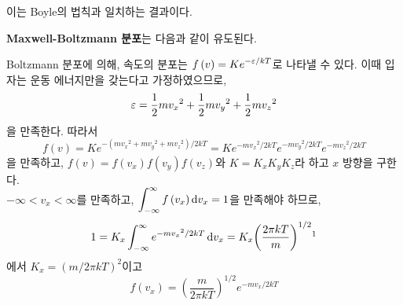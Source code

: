            이는 Boyle의 법칙과 일치하는 결과이다.
            \par \textbf{Maxwell-Boltzmann 분포}는 다음과 같이 유도된다.
            \begin{obs}
                Boltzmann 분포에 의해, 속도의 분포는 $\displaystyle f\left( v \right) = K e^{-\varepsilon / kT}$로 나타낼 수 있다. 이때 입자는 운동 에너지만을 갖는다고 가정하였으므로,
                \begin{equation*}
                    \varepsilon = \frac{1}{2} m {v_x}^2 + \frac{1}{2} m {v_y}^2 + \frac{1}{2} m {v_z}^2
                \end{equation*}
            을 만족한다. 따라서
                \begin{equation*}
                    \displaystyle f(v) = K e^{-\left(m{v_x}^2 + m{v_y}^2 + m{v_z}^2 \right)/2kT} = K e^{-m{v_x}^2 / 2kT} e^{-m{v_y}^2 / 2kT} e^{-m{v_z}^2 /2kT}
                \end{equation*}
            을 만족하고, $f \left( v \right) = f \left( v_x \right) f \left( v_y \right) f \left( v_z \right)$와 $K = K_x K_y K_z$라 하고 $x$ 방향을 구한다.\\
            $- \infty < v_x < \infty$를 만족하고, $\displaystyle\int_{-\infty}^{\infty} f \left( v_x \right) \operatorname{d\!} v_x = 1$을 만족해야 하므로,
            \renewcommand*{\thefootnote}{\fnsymbol{footnote}}
                \begin{equation*}
                    1 = K_x \int_{- \infty}^{\infty} e^{-m {v_x}^2 / 2kT} \difform v_x = K_x {\left( \frac{2 \pi k T}{m} \right)}^{1/2}\footnotemark[1]
                \end{equation*}
            에서 $K_x = {\left(m / 2 \pi kT \right)}^2$이고
                \begin{equation*}
                    f\left( v_x \right) = {\left( \frac{m}{2 \pi k T} \right)}^{1/2} e^{-mv_x / 2kT}
                \end{equation*}

\end{obs}

